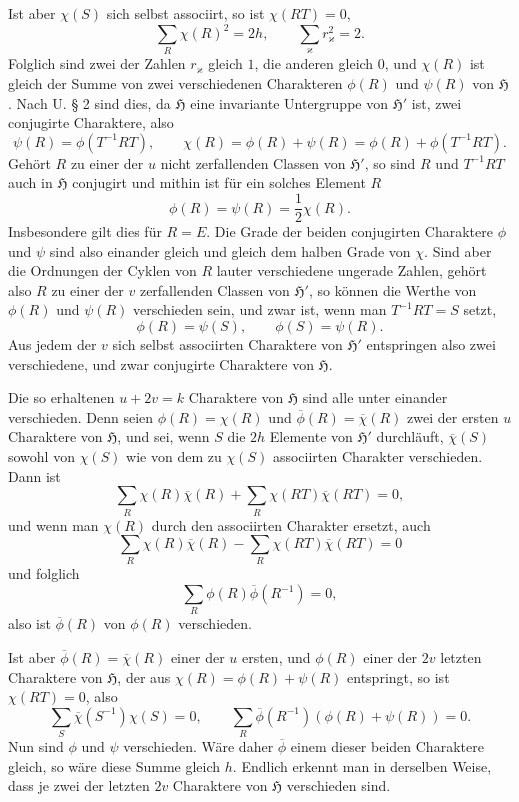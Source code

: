 \documentclass[11pt]{article}
\newcommand{\Hgr}{\mathfrak{H}}
\begin{document}
Ist aber $\chi(S)$ sich selbst associirt, so ist $\chi(RT)=0$,
\[
 \sum_R \chi(R)^2=2h,	\qquad \sum_\varkappa r_\varkappa^2=2.
\]
Folglich sind zwei der Zahlen $r_\varkappa$ gleich $1$, die anderen gleich $0$, und $\chi(R)$ ist gleich der Summe von zwei verschiedenen Charakteren $\phi(R)$ und $\psi(R)$ von $\Hgr$. Nach U. § 2 sind dies, da $\Hgr$ eine invariante Untergruppe von $\Hgr'$ ist, zwei conjugirte Charaktere, also
\begin{equation}\tag{2.}
 \psi(R)=\phi(T^{-1}RT),\qquad \chi(R)=\phi(R)+\psi(R)=\phi(R)+\phi(T^{-1}RT).
\end{equation}
Gehört $R$ zu einer der $u$ nicht zerfallenden Classen von $\Hgr'$, so sind $R$ und $T^{-1}RT$ auch in $\Hgr$ conjugirt und mithin ist für ein solches Element $R$
\begin{equation}\tag{u.}
 \phi(R)=\psi(R)=\frac12\chi(R).
\end{equation}
Insbesondere gilt dies für $R=E$. Die Grade der beiden conjugirten Charaktere $\phi$ und $\psi$ sind also einander gleich und gleich dem halben Grade von $\chi$. Sind aber die Ordnungen der Cyklen von $R$ lauter verschiedene ungerade Zahlen, gehört also $R$ zu einer der $v$ zerfallenden Classen von $\Hgr'$, so können die Werthe von $\phi(R)$ und $\psi(R)$ verschieden sein, und zwar ist, wenn man $T^{-1}RT=S$ setzt,
\begin{equation}\tag{v.}
 \phi(R)=\psi(S),	\qquad \phi(S)=\psi(R).
\end{equation}
Aus jedem der $v$ sich selbst associirten Charaktere von $\Hgr'$ entspringen also zwei verschiedene, und zwar conjugirte Charaktere von $\Hgr$.

Die so erhaltenen $u+2v=k$ Charaktere von $\Hgr$ sind alle unter einander verschieden. Denn seien $\phi(R)=\chi(R)$ und $\overline{\phi}(R)=\overline{\chi}(R)$ zwei der ersten $u$ Charaktere von $\Hgr$, und sei, wenn $S$ die $2h$ Elemente von $\Hgr'$ durchläuft, $\overline{\chi}(S)$ sowohl von $\chi(S)$ wie von dem zu $\chi(S)$ associirten Charakter verschieden. Dann ist
\[
 \sum_R \chi(R)\overline{\chi}(R)+\sum_R \chi(RT)\overline{\chi}(RT)=0,
\]
und wenn man $\chi(R)$ durch den associirten Charakter ersetzt, auch
\[
 \sum_R \chi(R)\overline{\chi}(R)-\sum_R\chi(RT)\overline{\chi}(RT)=0
\]
und folglich
\[
 \sum_R \phi(R)\overline{\phi}(R^{-1})=0,
\]
also ist $\overline{\phi}(R)$ von $\phi(R)$ verschieden.

Ist aber $\overline{\phi}(R)=\overline{\chi}(R)$ einer der $u$ ersten, und $\phi(R)$ einer der $2v$ letzten Charaktere von $\Hgr$, der aus $\chi(R)=\phi(R)+\psi(R)$ entspringt, so ist $\chi(RT)=0$, also
\[
 \sum_S \overline{\chi}(S^{-1})\chi(S)=0,	\qquad \sum_R\overline{\phi}(R^{-1})(\phi(R)+\psi(R))=0.
\]
Nun sind $\phi$ und $\psi$ verschieden. Wäre daher $\overline{\phi}$ einem dieser beiden Charaktere gleich, so wäre diese Summe gleich $h$. Endlich erkennt man in derselben Weise, dass je zwei der letzten $2v$ Charaktere von $\Hgr$ verschieden sind.
\end{document}
